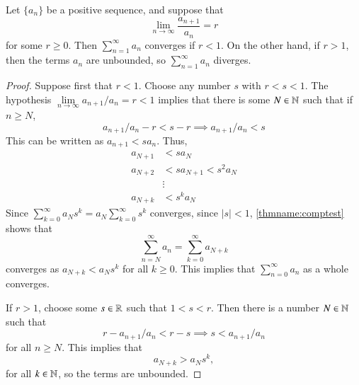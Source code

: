 \begin{namthm}\label{thmname:ratio}
    Let $\{a_n\}$ be a positive sequence, and suppose that \begin{equation*}
        \lim\limits_{n\rightarrow \infty}\frac{a_{n+1}}{a_n} = r
    \end{equation*}
    for some $r \geq 0$. Then $\sum\limits_{n=1}^{\infty}a_n$ converges if $r < 1$. On the other hand, if $r > 1$, then the terms $a_n$ are unbounded, so $\sum\limits_{n=1}^{\infty}a_n$ diverges.
\end{namthm}
\begin{proof}
    Suppose first that $r<1$. Choose any number $s$ with $r < s < 1$. The hypothesis $\lim\limits_{n\rightarrow \infty}a_{n+1}/a_n = r < 1$ implies that there is some $N \in \mathbb N$ such that if $n \geq N$, \begin{equation*}
        a_{n+1}/a_n - r < s-r \implies a_{n+1}/a_n < s
    \end{equation*}
    This can be written as $a_{n+1} < sa_n$. Thus, \begin{align*}
        a_{N+1} &< sa_N \\
        a_{N+2} &< sa_{N+1} < s^2a_N \\
        &\vdots \\
        a_{N+k} &< s^ka_N
    \end{align*}
    Since $\sum\limits_{k=0}^{\infty}a_Ns^k = a_N\sum\limits_{k=0}^{\infty}s^k$ converges, since $|s| < 1$, \ref{thmname:comptest} shows that \begin{equation*}
        \sum\limits_{n=N}^{\infty}a_n = \sum\limits_{k=0}^{\infty}a_{N+k}
    \end{equation*}
    converges as $a_{N+k} < a_Ns^k$ for all $k \geq 0$. This implies that $\sum\limits_{n=0}^{\infty}a_n$ as a whole converges.

    If $r > 1$, choose some $s \in \mathbb R$ such that $1 < s < r$. Then there is a number $N \in \mathbb N$ such that \begin{equation*}
        r - a_{n+1}/a_n < r-s \implies s < a_{n+1}/a_n
    \end{equation*}
    for all $n \geq N$. This implies that \begin{equation*}
        a_{N+k} > a_Ns^k,
    \end{equation*}
    for all $k \in \mathbb N$, so the terms are unbounded.
\end{proof}



